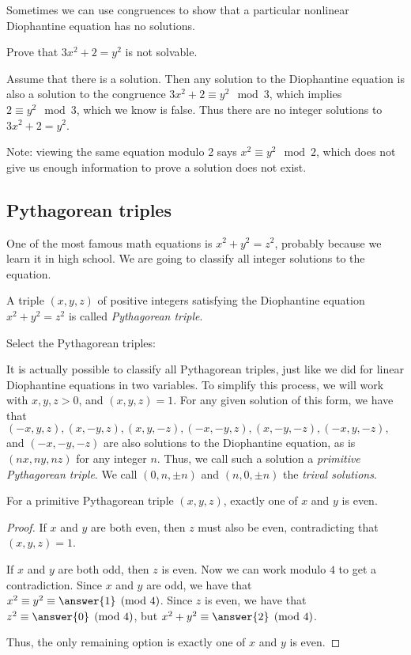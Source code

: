 \documentclass{ximera}
\begin{document}
Sometimes we can use congruences to show that a particular nonlinear Diophantine equation has no solutions. 

\begin{example}
 Prove that $3x^2+2=y^2$ is not solvable.
 
 Assume that there is a solution. Then any solution to the Diophantine equation is also a solution to the congruence $3x^2+2\equiv y^2 \mod 3$, which implies $2\equiv y^2 \mod 3$, which we know is false. Thus there are no integer solutions to $3x^2+2=y^2$.
\end{example}

Note: viewing the same equation modulo 2 says $x^2\equiv y^2 \mod 2$, which does not give us enough information to prove a solution does not exist.

\subsection*{Pythagorean triples}
One of the most famous math equations is $x^2+y^2=z^2$, probably because we learn it in high school. We are going to classify all integer solutions to the equation.

\begin{definition}
 A triple $(x,y,z)$ of positive integers satisfying the Diophantine equation $x^2+y^2=z^2$ is called \emph{Pythagorean triple}.
\end{definition}

 Select the Pythagorean triples:
 
\begin{selectAll}
\end{selectAll}

It is actually possible to classify all Pythagorean triples, just like we did for linear Diophantine equations in two variables. To simplify this process, we will work with $x,y,z>0$, and $(x,y,z)=1$. For any given solution of this form, we have that $(-x,y,z),(x,-y,z),(x,y,-z),(-x,-y,z),(x,-y,-z),(-x,y,-z),$ and $(-x,-y,-z)$ are also solutions to the Diophantine equation, as is $(nx,ny,nz)$ for any integer $n$. Thus, we call such a solution a \emph{primitive Pythagorean triple}.  We call $(0,n,\pm n)$ and $(n,0,\pm n)$ the \emph{trival solutions}.

\begin{theorem}
For a primitive Pythagorean triple $(x,y,z)$, exactly one of $x$ and $y$ is even.
\end{theorem}
\begin{proof}
 If $x$ and $y$ are both even, then $z$ must also be even, contradicting that $(x,y,z)=1$.
 
 If $x$ and $y$ are both odd, then $z$ is even. Now we can work modulo $4$ to get a contradiction. Since $x$ and $y$ are odd, we have that $x^2\equiv y^2\equiv \answer{1}\pmod 4$. Since $z$ is even, we have that $z^2\equiv \answer{0}\pmod 4$, but $x^2+y^2\equiv \answer{2}\pmod 4$.
 
 Thus, the only remaining option is exactly one of $x$ and $y$ is even.
\end{proof}
\end{document}
